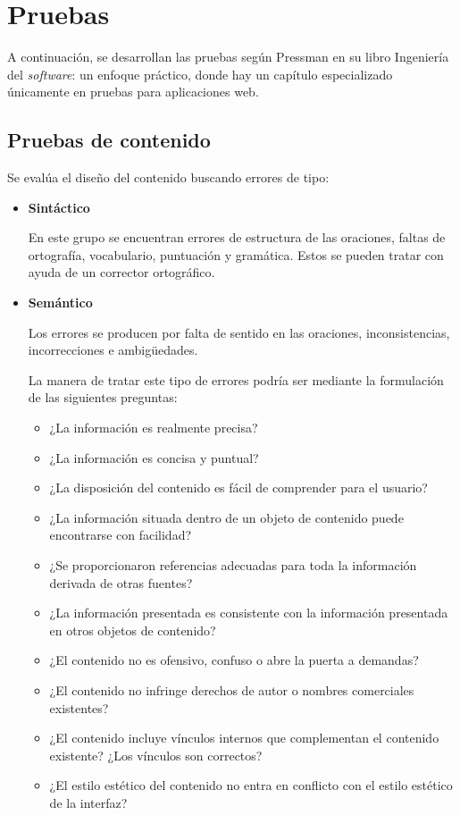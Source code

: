 \chapter{Pruebas}

A continuación, se desarrollan las pruebas según Pressman\cite{pressman} en su libro Ingeniería del \textit{software}: un enfoque práctico, donde hay un capítulo especializado únicamente en pruebas para aplicaciones web.

\section{Pruebas de contenido}

Se evalúa el diseño del contenido buscando errores de tipo:

\begin{itemize}
\item \textbf{Sintáctico}


En este grupo se encuentran errores de estructura de las oraciones, faltas de ortografía, vocabulario, puntuación y gramática. Estos se pueden tratar con ayuda de un corrector ortográfico\cite{ortografo}.


\item \textbf{Semántico}


Los errores se producen por falta de sentido en las oraciones, inconsistencias, incorrecciones e ambigüedades.



La manera de tratar este tipo de errores podría ser mediante la formulación de las siguientes preguntas:
\begin{itemize}
\item ¿La información es realmente precisa?
\item ¿La información es concisa y puntual?
\item ¿La disposición del contenido es fácil de comprender para el usuario?
\item ¿La información situada dentro de un objeto de contenido puede encontrarse con facilidad?
\item ¿Se proporcionaron referencias adecuadas para toda la información derivada de otras fuentes?
\item ¿La información presentada es consistente con la información presentada en otros objetos de contenido?
\item ¿El contenido no es ofensivo, confuso o abre la puerta a demandas?
\item ¿El contenido no infringe derechos de autor o nombres comerciales existentes?
\item ¿El contenido incluye vínculos internos que complementan el contenido existente? ¿Los vínculos son correctos?
\item ¿El estilo estético del contenido no entra en conflicto con el estilo estético de la interfaz?
	

\end{itemize}
\end{itemize}
